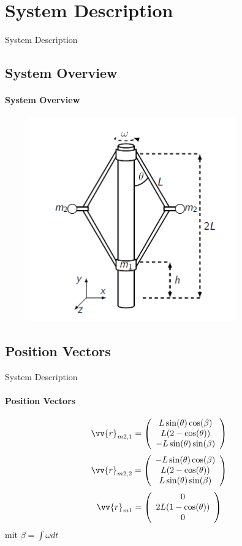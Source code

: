 \section{System Description}
\begin{frame}{System Description}
	\subsection{System Overview}
	\framesubtitle{System Overview}
	\begin{figure}[H]
		\centering
		\includegraphics[width=0.80\textwidth]{pics/overview.png}
	\end{figure}
\end{frame}

\subsection{Position Vectors}
\begin{frame}{System Description}
	\framesubtitle{Position Vectors}
	\begin{equation*}
	\vv{r}_{m2,1} = \left(\begin{array}{c}
	L\sin(\theta)\cos(\beta)\\ L(2-\cos(\theta)) \\ -L\sin(\theta)\sin(\beta)
	\end{array}\right)
	\end{equation*}
	\begin{equation*}
	\vv{r}_{m2,2} = \left(\begin{array}{c}
	-L\sin(\theta)\cos(\beta)\\ L(2-\cos(\theta)) \\ L\sin(\theta)\sin(\beta)
	\end{array}\right)
	\end{equation*}
	\begin{equation*}
	\vv{r}_{m1} = \left(\begin{array}{c}
	0\\ 2L(1-\cos(\theta)) \\ 0
	\end{array}\right)
	\end{equation*}
	\centering mit $\beta = \int \omega dt$
\end{frame}